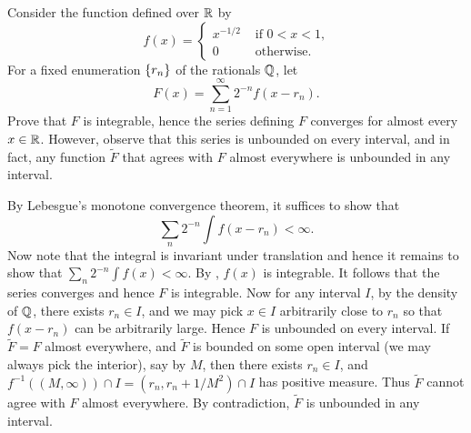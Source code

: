 \begin{exercise}
    Consider the function defined over $\mathbb{R}$ by 
    \begin{equation*}
        f(x) = \begin{cases}
            x^{-1/2} & \text{ if $0<x<1$,} \\
            0 & \text{ otherwise.}
        \end{cases}
    \end{equation*}
    For a fixed enumeration $\left\{ {r_n} \right\}$ of the rationals $\mathbb{Q}$, let 
    \begin{equation*}
        F(x) = \sum_{n=1}^{\infty} 2^{-n}f(x-r_n).
    \end{equation*}
    Prove that $F$ is integrable, hence the series defining $F$ converges 
    for almost every $x\in\mathbb{R}$. However, observe that this series is 
    unbounded on every interval, and in fact, any function $\tilde{F}$ 
    that agrees with $F$ almost everywhere is unbounded in any interval.
\end{exercise}
\begin{pf}
    By Lebesgue's monotone convergence theorem, it suffices to show that
    \begin{equation*}
        \sum_n 2^{-n}\int f(x-r_n) < \infty.
    \end{equation*} 
    Now note that the integral is invariant under translation and hence 
    it remains to show that $\sum_n 2^{-n}\int f(x) < \infty$. By 
    , $f(x)$ is integrable. It follows that the series converges 
    and hence $F$ is integrable. Now for any interval $I$, by the density 
    of $\mathbb{Q}$, there exists $r_n\in I$, and we may pick $x\in I$ arbitrarily 
    close to $r_n$ so that $f(x-r_n)$ can be arbitrarily large. Hence $F$ is 
    unbounded on every interval. If $\tilde{F}=F$ almost everywhere, and 
    $\tilde{F}$ is bounded on some open interval (we may always pick the 
    interior), say by $M$, then there exists $r_n\in I$, and 
    $f^{-1}((M,\infty))\cap I = (r_n, r_n + 1/M^2)\cap I$ has positive 
    measure. Thus $\tilde{F}$ cannot agree with $F$ almost everywhere. By 
    contradiction, $\tilde{F}$ is unbounded in any interval.
\end{pf}

